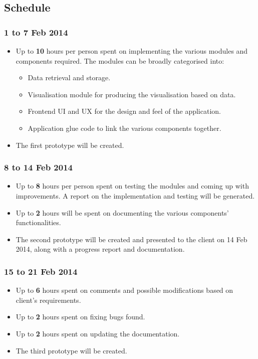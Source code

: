\documentclass[12pt,a4paper,twoside]{article}
\begin{document}
\subsection{Schedule}

\subsubsection{1 to 7 Feb 2014}
\begin{itemize}
	\item Up to \textbf{10} hours per person spent on implementing the various modules and components required. The modules can be broadly categorised into:
		\begin{itemize}
			\item Data retrieval and storage.
			\item Visualisation module for producing the visualisation based on data.
			\item Frontend UI and UX for the design and feel of the application.
			\item Application glue code to link the various components together.
		\end{itemize}
	\item The first prototype will be created.
\end{itemize}

\subsubsection{8 to 14 Feb 2014}
\begin{itemize}
	\item Up to \textbf{8} hours per person spent on testing the modules and coming up with improvements. A report on the implementation and testing will be generated.
	\item Up to \textbf{2} hours will be spent on documenting the various components' functionalities.
	\item The second prototype will be created and presented to the client on 14 Feb 2014, along with a progress report and documentation.
\end{itemize}

\subsubsection{15 to 21 Feb 2014}
\begin{itemize}
	\item Up to \textbf{6} hours spent on comments and possible modifications based on client's requirements.
	\item Up to \textbf{2} hours spent on fixing bugs found.
	\item Up to \textbf{2} hours spent on updating the documentation.
	\item The third prototype will be created.
\end{itemize}
\end{document}
